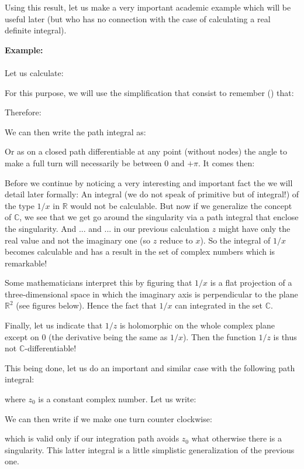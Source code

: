	Using this result, let us make a very important academic example which will be useful later (but who has no connection with the case of calculating a real definite integral).
	\begin{tcolorbox}[colframe=black,colback=white,sharp corners]
	\textbf{{\Large {}}Example:}\\\\
	Let us calculate:
	
	For this purpose, we will use the simplification that consist to remember () that:
	
	Therefore:
	
	We can then write the path integral as:
	
	Or as on a closed path differentiable at any point (without nodes) the angle to make a full turn will necessarily be between $0$ and $+\pi$. It comes then:
	
	\end{tcolorbox}
	Before we continue by noticing a very interesting and important fact the we will detail later formally: An integral (we do not speak of primitive but of integral!) of the type $1/x$ in $\mathbb{R}$ would not be calculable. But now if we generalize the concept of $\mathbb{C}$, we see that we get go around the singularity via a path integral that enclose the singularity. And ... and ... in our previous calculation $z$ might have only the real value and not the imaginary one (so $z$ reduce to $x$). So the integral of $1/x$ becomes calculable and has a result in the set of complex numbers which is remarkable!
	
	Some mathematicians interpret this by figuring that $1/x$ is a flat projection of a three-dimensional space in which the imaginary axis is perpendicular to the plane $\mathbb{R}^2$ (see figures below). Hence the fact that $1/x$ can integrated in the set $\mathbb{C}$.
	
	Finally, let us indicate that $1/z$ is holomorphic on the whole complex plane except on $0$ (the derivative being the same as $1/x$). Then the function $1/z$ is thus not $\mathbb{C}$-differentiable!
	
	This being done, let us do an important and similar case with the following path integral:
	
	where $z_0$ is a constant complex number. Let us write:
	
	We can then write if we make one turn counter clockwise:
	
	which is valid only if our integration path avoids $z_0$ what otherwise there is a singularity. This latter integral is a little simplistic generalization of the previous one.
	
